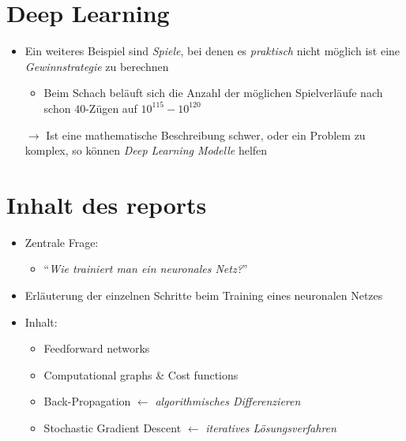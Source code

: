 \documentclass[t]{beamer}
\begin{document}
\section{Deep Learning}
\begin{frame}
    \begin{itemize}
        \item Ein weiteres Beispiel sind \emph{Spiele}, bei denen es \emph{praktisch} nicht möglich ist eine \emph{Gewinnstrategie} zu berechnen
        \begin{itemize}
            \item Beim Schach beläuft sich die Anzahl der möglichen Spielverläufe nach schon \(40\)-Zügen auf \(10^{115} - 10^{120}\)
            \newline
        \end{itemize}
        \item[\(\rightarrow\)] Ist eine mathematische Beschreibung schwer, oder ein Problem zu komplex, so können \emph{Deep Learning Modelle} helfen
    \end{itemize}
\end{frame}

\section{Inhalt des reports}
\begin{frame}
    \begin{itemize}
        \item Zentrale Frage: \newline 
        \begin{itemize}
            \item \enquote{\emph{Wie trainiert man ein neuronales Netz?}} \newline
        \end{itemize}
        \item Erläuterung der einzelnen Schritte beim Training eines neuronalen Netzes \newline
        \item Inhalt: \newline
        \begin{itemize}
            \item Feedforward networks
            \item Computational graphs \& Cost functions
            \item Back-Propagation \(\leftarrow\) \emph{algorithmisches Differenzieren}
            \item Stochastic Gradient Descent \(\leftarrow\) \emph{iteratives Lösungsverfahren}
        \end{itemize}

    \end{itemize}
\end{frame}
\end{document}
